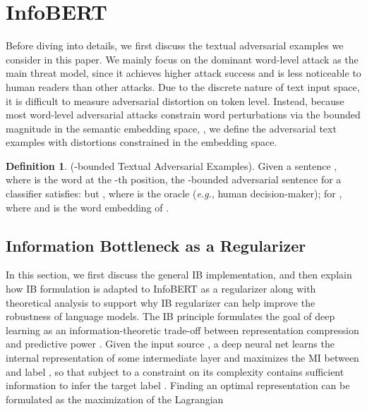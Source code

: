 \documentclass{article} \usepackage{iclr2021_conference,times}
\theoremstyle{definition}
\newtheorem{definition}{Definition}[section]
\theoremstyle{remark}
\newcommand{\method}{InfoBERT\xspace}
\newcommand{\modified}[1]{{\color{black}{#1}}}
\begin{document}
%
 \vspace{-1mm}
\section{\method}
\vspace{-1mm}





Before diving into details, we  first discuss the textual adversarial examples we consider in this paper. We mainly focus on the dominant word-level  attack as the main threat model, since it achieves higher attack success and is less noticeable to human readers than other attacks. 
Due to the discrete nature of text input space, it is difficult to measure adversarial distortion on token level.
Instead, because most word-level adversarial attacks \citep{textbugger,textfooler} constrain word perturbations via the bounded magnitude in the semantic embedding space, \modified{by adapting from \citet{jacobsen2018excessive}}, we define the adversarial text examples with distortions constrained in the embedding space.




\begin{definition}\label{def:adv}(-bounded Textual Adversarial Examples). Given a sentence , where  is the word at the -th position, the -bounded adversarial sentence  for a classifier  satisfies:   but , where  is the oracle (\emph{e.g.}, human decision-maker);   for , where  and  is the word embedding of . 
\end{definition}



\subsection{Information Bottleneck as a Regularizer}
In this section, we first discuss the general IB implementation, and then explain how IB formulation is adapted to \method as a regularizer  along with  theoretical analysis to support why IB regularizer can help improve the robustness of language models.
The IB principle formulates the goal of deep learning as an information-theoretic trade-off between representation compression and predictive power \citep{deepib}. Given the input source , a deep neural net learns the internal representation  of some intermediate layer and maximizes the MI between  and label , so that  subject to a constraint on its complexity contains sufficient information to infer the target label . Finding an optimal representation  can be formulated as the maximization of
the Lagrangian
\end{document}

